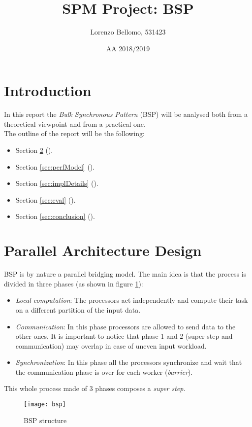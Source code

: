 \documentclass[]{article}
\title{SPM Project: BSP}
\author{Lorenzo Bellomo, 531423}
\date{AA 2018/2019}
\begin{document}
\maketitle

\section{Introduction}

In this report the \emph{Bulk Synchronous Pattern} (BSP) will be analysed both from a theoretical viewpoint and from a practical one. \\
The outline of the report will be the following:
\begin{itemize}
	\item Section \ref{sec:parDesign} ().
	\item Section \ref{sec:perfModel} ().
	\item Section \ref{sec:implDetails} ().
	\item Section \ref{sec:eval} ().
	\item Section \ref{sec:conclusion} ().
\end{itemize}

\section{Parallel Architecture Design}
\label{sec:parDesign}

BSP is by nature a parallel bridging model. The main idea is that the process is divided in three phases (as shown in figure \ref{fig:BSP}):
\begin{itemize}
	\item \emph{Local computation}: The processors act independently and compute their task on a different partition of the input data.
	\item \emph{Communication}: In this phase processors are allowed to send data to the other ones. It is important to notice that phase 1 and 2 (super step and communication) may overlap in case of uneven input workload.
	\item \emph{Synchronization}: In this phase all the processors synchronize and wait that the communication phase is over for each worker (\emph{barrier}).
\end{itemize}
This whole process made of 3 phases composes a \emph{super step}.
\begin{figure}[H]
	\centering
	\texttt{[image: bsp]}
	\caption{BSP structure}
	\label{fig:BSP}
\end{figure}
\end{document}
